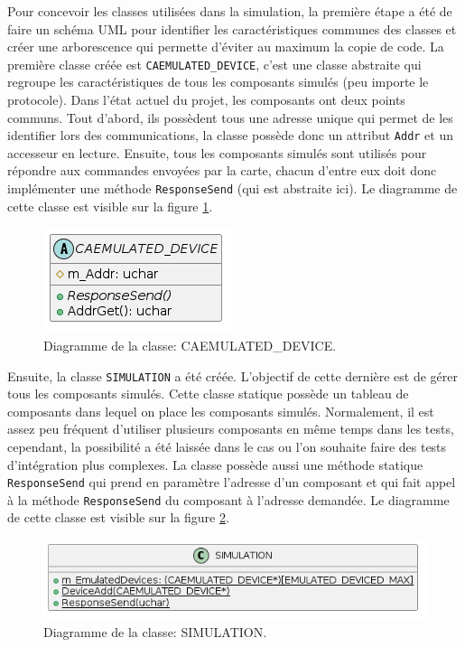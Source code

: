 \documentclass[a4paper]{article}
\begin{document}
Pour concevoir les classes utilisées dans la simulation, la première étape a été
de faire un schéma UML pour identifier les caractéristiques communes des classes
et créer une arborescence qui permette d'éviter au maximum la copie de code. La
première classe créée est \verb|CAEMULATED_DEVICE|, c'est une classe abstraite
qui regroupe les caractéristiques de tous les composants simulés (peu importe le
protocole). Dans l'état actuel du projet, les composants ont deux points
communs. Tout d'abord, ils possèdent tous une adresse unique qui permet de les
identifier lors des communications, la classe possède donc un attribut
\verb|Addr| et un accesseur en lecture. Ensuite, tous les composants simulés
sont utilisés pour répondre aux commandes envoyées par la carte, chacun d'entre
eux doit donc implémenter une méthode \verb|ResponseSend| (qui est abstraite
ici). Le diagramme de cette classe est visible sur la figure
\ref{fig:caemulateddevice}.

\begin{figure}[h!]
  \begin{center}
  \includegraphics[scale=0.5]{./graphs/emulated_device.png}
  \caption{Diagramme de la classe: CAEMULATED\_DEVICE.}
    \label{fig:caemulateddevice}
  \end{center}
\end{figure}

Ensuite, la classe \verb|SIMULATION| a été créée. L'objectif de cette dernière
est de gérer tous les composants simulés. Cette classe statique possède un
tableau de composants dans lequel on place les composants simulés. Normalement,
il est assez peu fréquent d'utiliser plusieurs composants en même temps dans les
tests, cependant, la possibilité a été laissée dans le cas ou l'on souhaite
faire des tests d'intégration plus complexes. La classe possède aussi une
méthode statique \verb|ResponseSend| qui prend en paramètre l'adresse d'un
composant et qui fait appel à la méthode \verb|ResponseSend| du composant à
l'adresse demandée. Le diagramme de cette classe est visible sur la figure
\ref{fig:simulationclasse}.

\begin{figure}[h!]
  \begin{center}
  \includegraphics[scale=0.5]{./graphs/simulation_classe.png}
    \caption{Diagramme de la classe: SIMULATION.}
    \label{fig:simulationclasse}
  \end{center}
\end{figure}
\end{document}
